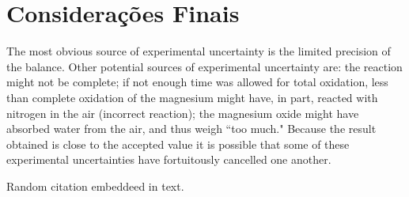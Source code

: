 \documentclass[a4paper,12pt]{article}
\begin{document}
        
        \section{Considerações Finais}
        
        
        The most obvious source of experimental uncertainty is the limited precision of the balance. Other potential sources of experimental uncertainty are: the reaction might not be complete; if not enough time was allowed for total oxidation, less than complete oxidation of the magnesium might have, in part, reacted with nitrogen in the air (incorrect reaction); the magnesium oxide might have absorbed water from the air, and thus weigh ``too much." Because the result obtained is close to the accepted value it is possible that some of these experimental uncertainties have fortuitously cancelled one another.

        Random citation \cite{WEBSITE:2} embeddeed in text.

        
        
        
        


    
\end{document}
